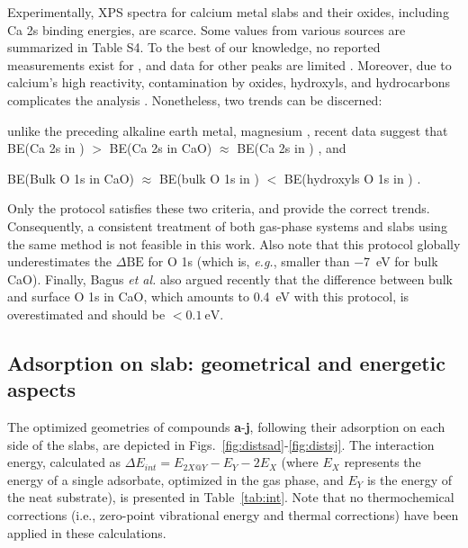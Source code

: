 \documentclass[journal=jpccck,manuscript=article]{achemso}
\def\dbe{\ensuremath{\Delta\text{BE}}}
\begin{document}
Experimentally, XPS spectra for calcium metal slabs and their oxides, including Ca 2s binding energies, are scarce. Some values from various sources are summarized in Table S4. To the best of our knowledge, no reported measurements exist for , and data for other peaks are limited \cite{franzenXPSSpectraCrystalline1977,sveinbjornssonIonicConductivityFormation2014}. Moreover, due to calcium's high reactivity, contamination by oxides, hydroxyls, and hydrocarbons complicates the analysis \cite{dupinSystematicXPSStudies2000,bebenseeAdsorptionOxygenWater2008,fujimoriInteractionWaterCaO2016a,cristXPSLibraryWebsite2021a}. Nonetheless, two trends can be discerned: \begin{inparaenum}[(i)]
	\item unlike the preceding alkaline earth metal, magnesium \cite{dobrovolskyXPSStudyInfluence2017}, recent data suggest that BE(Ca 2s in ) $>$ BE(Ca 2s in CaO) $\approx$ BE(Ca 2s in ) \cite{ochsCO2ChemisorptionCa1998,cristHandbookMonochromaticXPS2000a,cristXPSLibraryWebsite2021a}, and 
	\item BE(Bulk O 1s in CaO) $\approx$ BE(bulk O 1s in ) $<$ BE(hydroxyls O 1s in ) \cite{dupinSystematicXPSStudies2000,bebenseeAdsorptionOxygenWater2008,fujimoriInteractionWaterCaO2016a,cristXPSLibraryWebsite2021a}.
\end{inparaenum}
Only the  protocol satisfies these two criteria, and provide the correct trends. Consequently, a consistent treatment of both gas-phase systems and slabs using the same method is not feasible in this work. Also note that this protocol globally underestimates the \dbe{} for O 1s (which is, \textit{e.g.}, smaller than \SI{-7}{\electronvolt} for bulk CaO\cite{cristXPSLibraryWebsite2021a}). Finally, Bagus \emph{et al.}\cite{bagusRevisitingSurfaceCorelevel2019} also argued recently that the difference between bulk and surface O 1s in CaO, which amounts to \SI{0.4}{\electronvolt} with this protocol, is overestimated  and should be $<\SI{0.1}{\electronvolt}$.



\clearpage

\subsection{Adsorption on slab: geometrical and energetic aspects}\label{sec:geom}

The optimized geometries of compounds \textbf{a}-\textbf{j}, following their adsorption on each side of the slabs, are depicted in Figs.~\ref{fig:distsad}-\ref{fig:distsj}. The interaction energy, calculated as $\Delta E_{int} = E_{2X@Y} - E_Y - 2E_X$ (where $E_X$ represents the energy of a single adsorbate, optimized in the gas phase, and $E_Y$ is the energy of the neat substrate), is presented in Table~\ref{tab:int}. Note that no thermochemical corrections (i.e., zero-point vibrational energy and thermal corrections) have been applied in these calculations.
\end{document}
